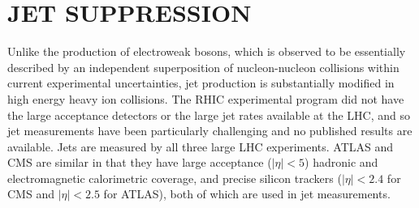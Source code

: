 \section{JET SUPPRESSION}
\label{jets}
Unlike the production of electroweak bosons, which is observed to be essentially described by
an independent superposition of nucleon-nucleon collisions within current experimental uncertainties,
jet production is substantially modified in high energy heavy ion collisions.
The RHIC experimental program did not have the large acceptance detectors or the large jet rates 
available at the LHC, and so jet measurements have been particularly challenging and no 
published results are available.
Jets are measured by all three large LHC experiments.  ATLAS and CMS are similar in that they
have large acceptance ($|\eta|<5$) hadronic and electromagnetic calorimetric coverage, and 
precise silicon trackers ($|\eta|<2.4$ for CMS and $|\eta|<2.5$ for ATLAS), 
both of which are used in jet measurements.
